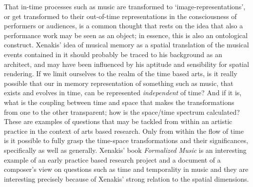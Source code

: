 That in-time processes such as music are transformed to `image-representations', or get transformed to their out-of-time representations in the consciousness of performers or audiences, is a common thought that rests on the idea that also a performance work may be seen as an object; in essence, this is also an ontological construct. 
Xenakis' idea of musical memory as a spatial translation of the musical events contained in it should probably be traced to his background as an architect, and may have been influenced by his aptitude and sensibility for spatial rendering. If we limit ourselves to the realm of the time based arts, is it really possible that our in memory representation of something such as music, that exists and evolves in time, can be represented \emph{independent} of time? And if it is, what is the coupling between time and space that makes the transformations from one to the other transparent; how is the space/time spectrum calculated? These are examples of questions that may be tackled from within an artistic practice in the context of arts based research. Only from within the flow of time is it possible to fully grasp the time-space transformations and their significances, specifically as well as generally. Xenakis' book \emph{Formalized Music} is an interesting example of an early practice based research project and a document of a composer's view on questions such as time and temporality in music and they are interesting precisely because of Xenakis' strong relation to the spatial dimensions. %

